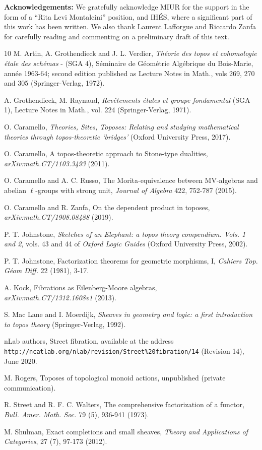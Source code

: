 \documentclass[a4paper,12pt]{article}
\begin{document}
\bigskip
\textbf{Acknowledgements:} We gratefully acknowledge MIUR for the support in the form of a ``Rita Levi Montalcini'' position, and IH\'ES, where a significant part of this work has been written. We also thank Laurent Lafforgue and Riccardo Zanfa for carefully reading and commenting on a preliminary draft of this text.  

\begin{thebibliography}{10}	
	 M. Artin, A. Grothendieck and J. L. Verdier, \emph{Th\'eorie des topos et cohomologie \'etale des sch\'emas} - (SGA 4), S\'eminaire de G\'eom\'etrie Alg\'ebrique du Bois-Marie, ann\'ee 1963-64; second edition published as Lecture Notes in Math., vols 269, 270 and 305 (Springer-Verlag, 1972). 
	
	 A. Grothendieck, M. Raynaud, \emph{Rev\^{e}tements \'etales et groupe fondamental} (SGA 1), Lecture Notes in Math., vol. 224 (Springer-Verlag, 1971).
	
	 O. Caramello, \emph{Theories, Sites, Toposes: Relating and studying mathematical theories through topos-theoretic `bridges'} (Oxford University Press, 2017).  
		
	 O. Caramello, A topos-theoretic approach to Stone-type dualities, \emph{arXiv:math.CT/1103.3493} (2011). 
	
	 O. Caramello and A. C. Russo, The Morita-equivalence between MV-algebras and abelian $\ell$-groups with strong unit, \emph{Journal of Algebra} 422, 752-787 (2015).
	
	 O. Caramello and R. Zanfa, On the dependent product in toposes, \emph{arXiv:math.CT/1908.08488} (2019).
		
	 P. T. Johnstone, \emph{Sketches of an Elephant: a topos theory compendium. Vols. 1 and 2}, vols. 43 and 44 of \emph{Oxford Logic Guides} (Oxford University Press, 2002).
	
	 P. T. Johnstone, Factorization theorems for geometric morphisms, I, \emph{Cahiers Top. G\'eom Diff.} 22 (1981), 3-17.
	
	 A. Kock, Fibrations as Eilenberg-Moore algebras, \\ \emph{arXiv:math.CT/1312.1608v1} (2013).
	
	 S. Mac Lane and I. Moerdijk, \emph{Sheaves in geometry and logic: a first introduction to topos theory} (Springer-Verlag, 1992).
	
	 nLab authors, Street fibration, available at the address \texttt{http://ncatlab.org/nlab/revision/Street\%20fibration/14} (Revision 14), June 2020.

	 M. Rogers, Toposes of topological monoid actions, unpublished (private communication).
	
	 R. Street and R. F. C.  Walters, The comprehensive factorization of a functor, \emph{Bull. Amer. Math. Soc.} 79 (5), 936-941 (1973).
	
	 M. Shulman, Exact completions and small sheaves, \emph{Theory and Applications of Categories}, 27 (7), 97-173 (2012).  
\end{thebibliography}
\end{document}
